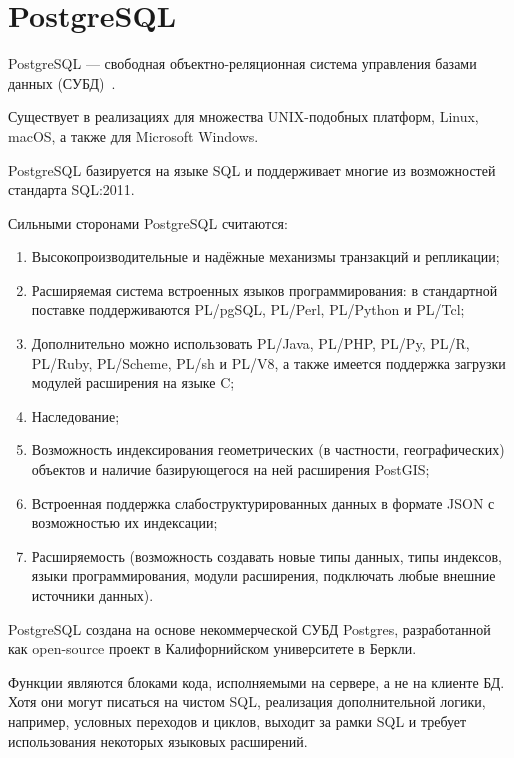 \documentclass{altsu-report}
\begin{document}
\section*{PostgreSQL}

PostgreSQL --- свободная объектно-реляционная система управления базами данных (СУБД)~\cite{PostgreSQL}.

Существует в реализациях для множества UNIX-подобных платформ, Linux, macOS, а также для Microsoft Windows.

PostgreSQL базируется на языке SQL и поддерживает многие из возможностей стандарта SQL:2011.

Сильными сторонами PostgreSQL считаются:

\begin{enumerate}
    \item Высокопроизводительные и надёжные механизмы транзакций и репликации;

    \item Расширяемая система встроенных языков программирования: в стандартной поставке поддерживаются PL/pgSQL, PL/Perl, PL/Python и PL/Tcl;
    
    \item Дополнительно можно использовать PL/Java, PL/PHP, PL/Py, PL/R, PL/Ruby, PL/Scheme, PL/sh и PL/V8, а также имеется поддержка загрузки модулей расширения на языке C;

    \item Наследование;

    \item Возможность индексирования геометрических (в частности, географических) объектов и наличие базирующегося на ней расширения PostGIS;

    \item Встроенная поддержка слабоструктурированных данных в формате JSON с возможностью их индексации;

    \item Расширяемость (возможность создавать новые типы данных, типы индексов, языки программирования, модули расширения, подключать любые внешние источники данных).
\end{enumerate}

PostgreSQL создана на основе некоммерческой СУБД Postgres, разработанной как open-source проект в Калифорнийском университете в Беркли.

Функции являются блоками кода, исполняемыми на сервере, а не на клиенте БД. Хотя они могут писаться на чистом SQL, реализация дополнительной логики, например, условных переходов и циклов, выходит за рамки SQL и требует использования некоторых языковых расширений.
\end{document}
